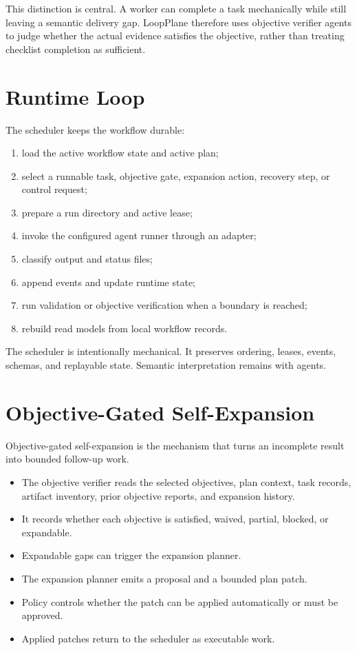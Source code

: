 \documentclass[11pt]{article}
\begin{document}
This distinction is central. A worker can complete a task mechanically while
still leaving a semantic delivery gap. LoopPlane therefore uses objective
verifier agents to judge whether the actual evidence satisfies the objective,
rather than treating checklist completion as sufficient.

\section{Runtime Loop}

The scheduler keeps the workflow durable:

\begin{enumerate}
\item load the active workflow state and active plan;
\item select a runnable task, objective gate, expansion action, recovery step,
or control request;
\item prepare a run directory and active lease;
\item invoke the configured agent runner through an adapter;
\item classify output and status files;
\item append events and update runtime state;
\item run validation or objective verification when a boundary is reached;
\item rebuild read models from local workflow records.
\end{enumerate}

The scheduler is intentionally mechanical. It preserves ordering, leases,
events, schemas, and replayable state. Semantic interpretation remains with
agents.

\section{Objective-Gated Self-Expansion}

Objective-gated self-expansion is the mechanism that turns an incomplete result
into bounded follow-up work.

\begin{itemize}
\item The objective verifier reads the selected objectives, plan context, task
records, artifact inventory, prior objective reports, and expansion history.
\item It records whether each objective is satisfied, waived, partial, blocked,
or expandable.
\item Expandable gaps can trigger the expansion planner.
\item The expansion planner emits a proposal and a bounded plan patch.
\item Policy controls whether the patch can be applied automatically or must be
approved.
\item Applied patches return to the scheduler as executable work.
\end{itemize}
\end{document}
